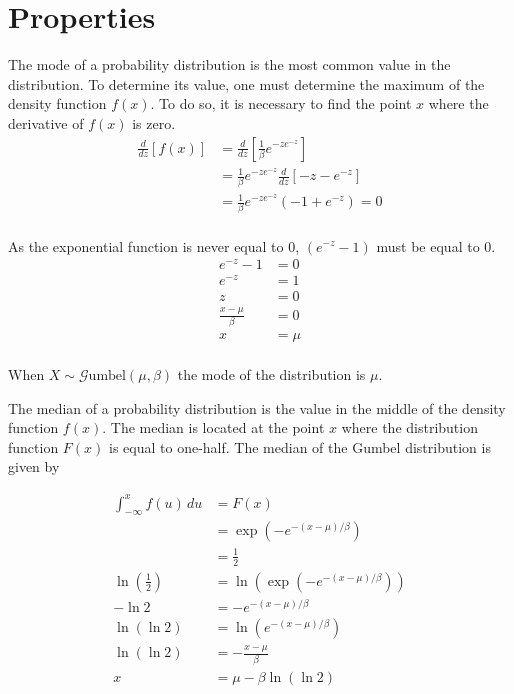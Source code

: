 \documentclass[titlepage,12 pt]{article}
\begin{document}
\section{Properties}

The mode of a probability distribution is the most common value in the distribution. To determine its value, one must determine the maximum of the density function $f(x)$. To do so, it is necessary to find the point $x$ where the derivative of $f(x)$ is zero.
\begin{align*}
\frac{d}{dz}[f(x)] &= \frac{d}{dz} \left[ \frac{1}{\beta}e^{-ze^{-z}} \right] \\[3mm]
&= \frac{1}{\beta}e^{-ze^{-z}} \frac{d}{dz} \left[ -z-e^{-z} \right] \\[3mm]
&= \frac{1}{\beta}e^{-ze^{-z}} \left( -1+e^{-z} \right) =0 \\[3mm]
\end{align*}

As the exponential function is never equal to 0, $(e^{-z}-1)$ must be equal to 0.
\begin{align*}
   e^{-z}-1&=0 \\
   e^{-z}&=1 \\
   z&=0 \\
   \frac{x-\mu}{\beta}&=0 \\
   x&=\mu \\
\end{align*}

When $ X \sim \mathcal{G}\text{umbel}(\mu,\beta) $ the mode of the distribution is $\mu$.

The median of a probability distribution is the value in the middle of the density function $f(x)$. The median is located at the point $x$ where the distribution function $F(x)$ is equal to one-half. The median of the Gumbel distribution is given by

\begin{align*}
\int_{-\infty}^{x}f(u)\,du&=F(x) \\
&=\exp\left( -e^{-(x-\mu)/\beta} \right) \\
&= \frac{1}{2} \\
\ln{\left(\frac{1}{2}\right)}&=\ln{\left(\exp\left( -e^{-(x-\mu)/\beta} \right)\right)} \\[3mm]
-\ln{2}&=-e^{-(x-\mu)/\beta} \\[3mm]
\ln(\ln{2})&=\ln{\left(e^{-(x-\mu)/\beta}\right)} \\[3mm]
\ln(\ln{2})&=-\frac{x-\mu}{\beta} \\[2mm]
x&=\mu-\beta\ln{(\ln2)} \\
\end{align*}
\end{document}

